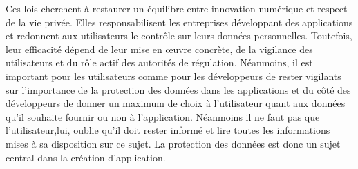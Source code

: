 \documentclass{article}
\begin{document}
Ces lois cherchent à restaurer un équilibre entre innovation numérique et respect de la vie privée. Elles responsabilisent les entreprises développant des applications et redonnent aux utilisateurs le contrôle sur leurs données personnelles. Toutefois, leur efficacité dépend de leur mise en œuvre concrète, de la vigilance des utilisateurs et du rôle actif des autorités de régulation. Néanmoins, il est important pour les utilisateurs comme pour les développeurs de rester vigilants sur l'importance de la protection des données dans les applications et du côté des développeurs de donner un maximum de choix à l’utilisateur quant aux données qu'il souhaite fournir ou non à l'application. Néanmoins il ne faut pas que l'utilisateur,lui, oublie qu'il doit rester informé et lire toutes les informations mises à sa disposition sur ce sujet. La protection des données est donc un sujet central dans la création d'application.
\end{document}
